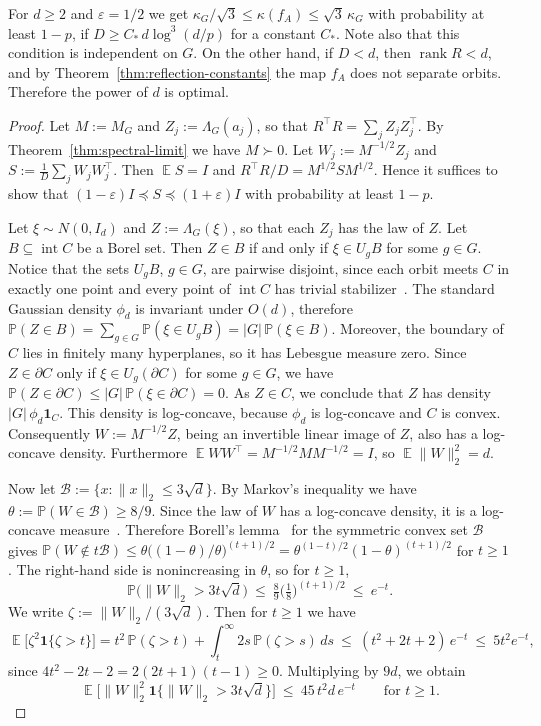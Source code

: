 \documentclass[11pt]{article}
\theoremstyle{definition}
\DeclareMathOperator{\EX}{\mathbb{E}}
\begin{document}
 For $d\ge2$ and $\varepsilon=1/2$ we get $\kappa_G/\sqrt3\le\kappa(f_A)\le\sqrt3\,\kappa_G$
with probability at least $1-p$, if $D\ge C_\ast\,d\log^3(d/p)$ for a constant
$C_\ast$. Note also that this condition is independent on $G$. On the other hand, if $D<d$, then
$\operatorname{rank}R<d$, and by Theorem~\ref{thm:reflection-constants} the map $f_A$ does not
separate orbits. Therefore the power of $d$ is optimal.

\begin{proof}
	Let $M:=M_G$ and $Z_j:=\Lambda_G(a_j)$, so that $R^{\!\top}R=\sum_jZ_jZ_j^{\!\top}$. By
	Theorem~\ref{thm:spectral-limit} we have $M\succ0$. Let $W_j:=M^{-1/2}Z_j$ and
	$S:=\frac1D\sum_jW_jW_j^{\!\top}$. Then $\EX S=I$ and $R^{\!\top}R/D=M^{1/2}SM^{1/2}$. Hence it
	suffices to show that $(1-\varepsilon)I\preceq S\preceq(1+\varepsilon)I$ with probability
	at least $1-p$.
	
	Let $\xi\sim N(0,I_d)$ and
	$Z:=\Lambda_G(\xi)$, so that each $Z_j$ has the law of $Z$. Let $B\subseteq\operatorname{int}C$
	be a Borel set. Then $Z\in B$ if and only if $\xi\in U_gB$ for some $g\in G$. Notice that the
	sets $U_gB$, $g\in G$, are pairwise disjoint, since each orbit meets $C$ in exactly one point
	and every point of $\operatorname{int}C$ has trivial stabilizer~\cite[Thm.~1.12]{humphreys}.
	The standard Gaussian density $\phi_d$ is invariant under $O(d)$, therefore
	$\mathbb{P}(Z\in B)=\sum_{g\in G}\mathbb{P}(\xi\in U_gB)=|G|\,\mathbb{P}(\xi\in B)$. Moreover,
	the boundary of $C$ lies in finitely many hyperplanes, so it has Lebesgue measure zero. Since
	$Z\in\partial C$ only if $\xi\in U_g(\partial C)$ for some $g\in G$, we have
	$\mathbb{P}(Z\in\partial C)\le|G|\,\mathbb{P}(\xi\in\partial C)=0$. As $Z\in C$, we
	conclude that $Z$ has density $|G|\,\phi_d\mathbf 1_C$. This density is log-concave, because
	$\phi_d$ is log-concave and $C$ is convex. Consequently $W:=M^{-1/2}Z$, being an invertible
	linear image of $Z$, also has a log-concave density. Furthermore
	$\EX WW^{\!\top}=M^{-1/2}MM^{-1/2}=I$, so $\EX\|W\|_2^2=d$.
	
	Now let $\mathcal B:=\{x:\|x\|_2\le3\sqrt d\}$. By Markov's
	inequality we have $\theta:=\mathbb{P}(W\in\mathcal B)\ge8/9$. Since the
	law of $W$ has a log-concave density, it is a log-concave measure~\cite{borell1975convex}.
	Therefore Borell's lemma~\cite{borell1974convex} for the symmetric convex set $\mathcal B$ gives
	$\mathbb{P}(W\notin t\mathcal B)\le\theta\bigl((1-\theta)/\theta\bigr)^{(t+1)/2}
	=\theta^{(1-t)/2}(1-\theta)^{(t+1)/2}$ for $t\ge1$. The right-hand side is nonincreasing in
	$\theta$, so for $t\ge1$,
	\[
	\mathbb{P}\bigl(\|W\|_2>3t\sqrt d\bigr)\ \le\ \tfrac89\bigl(\tfrac18\bigr)^{(t+1)/2}\ \le\ e^{-t}.
	\]
	We write $\zeta:=\|W\|_2/(3\sqrt d)$. Then for $t\ge1$ we have
	\[
	\EX\bigl[\zeta^2\mathbf 1\{\zeta>t\}\bigr]=t^2\,\mathbb{P}(\zeta>t)+\int_t^\infty2s\,\mathbb{P}(\zeta>s)\,ds
	\ \le\ (t^2+2t+2)\,e^{-t}\ \le\ 5t^2e^{-t},
	\]
	since $4t^2-2t-2=2(2t+1)(t-1)\ge0$. Multiplying by $9d$, we obtain
	\begin{equation}\label{eq:W-tail}
		\EX\bigl[\|W\|_2^2\mathbf 1\{\|W\|_2>3t\sqrt d\}\bigr]\ \le\ 45\,t^2d\,e^{-t}
		\qquad\text{for }t\ge1.
	\end{equation}
	

\end{proof}
\end{document}
